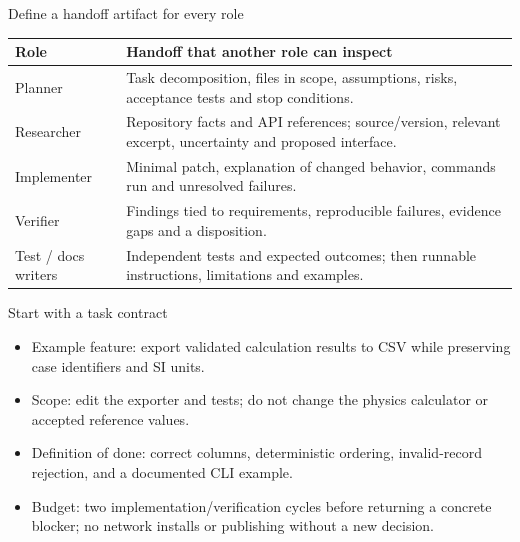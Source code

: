 \documentclass[aspectratio=169,11pt]{beamer}
\begin{document}
\begin{frame}[t,fragile]{Define a handoff artifact for every role}
\fontsize{10.5}{12.5}\selectfont\setlength{\tabcolsep}{4pt}\renewcommand{\arraystretch}{1.15}
\begin{tabular}{>{\raggedright\arraybackslash}p{}>{\raggedright\arraybackslash}p{}}
\toprule
\textbf{Role} & \textbf{Handoff that another role can inspect} \\ \midrule
Planner & Task decomposition, files in scope, assumptions, risks, acceptance tests and stop conditions. \\[2pt]
Researcher & Repository facts and API references; source/version, relevant excerpt, uncertainty and proposed interface. \\[2pt]
Implementer & Minimal patch, explanation of changed behavior, commands run and unresolved failures. \\[2pt]
Verifier & Findings tied to requirements, reproducible failures, evidence gaps and a disposition. \\[2pt]
Test / docs writers & Independent tests and expected outcomes; then runnable instructions, limitations and examples. \\[2pt]
\bottomrule\end{tabular}\par\vspace{2mm}
\end{frame}
\begin{frame}[t,fragile]{Start with a task contract}
\fontsize{11.5}{14}\selectfont
\begin{itemize}\setlength{\itemsep}{2mm}
\item Example feature: export validated calculation results to CSV while preserving case identifiers and SI units.
\item Scope: edit the exporter and tests; do not change the physics calculator or accepted reference values.
\item Definition of done: correct columns, deterministic ordering, invalid-record rejection, and a documented CLI example.
\item Budget: two implementation/verification cycles before returning a concrete blocker; no network installs or publishing without a new decision.
\end{itemize}
\end{frame}
\end{document}
